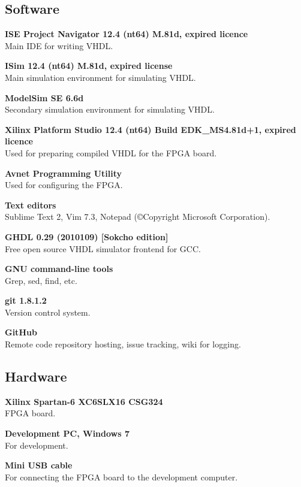 
\subsection{Software}
\begin{description}
    \item{\textbf{ISE Project Navigator 12.4 (nt64) M.81d, expired licence}} \\
        Main IDE for writing VHDL.
    \item{\textbf{ISim 12.4 (nt64) M.81d, expired license}} \\
        Main simulation environment for simulating VHDL.
    \item{\textbf{ModelSim SE 6.6d}} \\
        Secondary simulation environment for simulating VHDL.
    \item{\textbf{Xilinx Platform Studio 12.4 (nt64) Build EDK\_MS4.81d+1, expired licence}} \\
        Used for preparing compiled VHDL for the FPGA board.
    \item{\textbf{Avnet Programming Utility}} \\
        Used for configuring the FPGA.
    \item{\textbf{Text editors}} \\
        Sublime Text 2, Vim 7.3, Notepad (©Copyright Microsoft Corporation).
    \item{\textbf{GHDL 0.29 (2010109) [Sokcho edition]}} \\
        Free open source VHDL simulator frontend for GCC.

    \item{\textbf{GNU command-line tools}} \\
        Grep, sed, find, etc.
    \item{\textbf{git 1.8.1.2}} \\
        Version control system.
    \item{\textbf{GitHub}} \\
        Remote code repository hosting, issue tracking, wiki for logging.
\end{description}

\subsection{Hardware}
\begin{description}
\item{\textbf{Xilinx Spartan-6 XC6SLX16 CSG324}} \\
    FPGA board.
\item{\textbf{Development PC, Windows 7}} \\
    For development.
\item{\textbf{Mini USB cable}} \\
    For connecting the FPGA board to the development computer.
\end{description}


